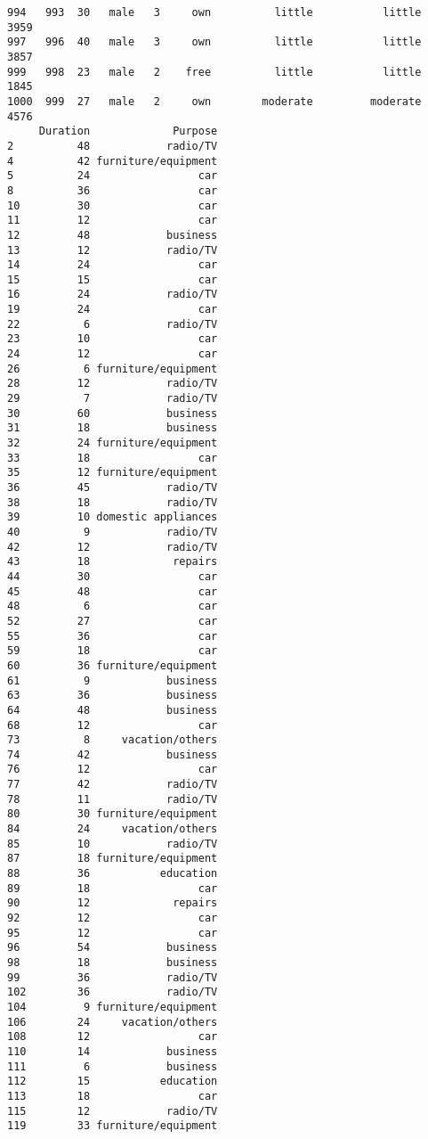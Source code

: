 \documentclass[
]{article}
\begin{document}
\begin{verbatim}
994   993  30   male   3     own          little           little          3959
997   996  40   male   3     own          little           little          3857
999   998  23   male   2    free          little           little          1845
1000  999  27   male   2     own        moderate         moderate          4576
     Duration             Purpose
2          48            radio/TV
4          42 furniture/equipment
5          24                 car
8          36                 car
10         30                 car
11         12                 car
12         48            business
13         12            radio/TV
14         24                 car
15         15                 car
16         24            radio/TV
19         24                 car
22          6            radio/TV
23         10                 car
24         12                 car
26          6 furniture/equipment
28         12            radio/TV
29          7            radio/TV
30         60            business
31         18            business
32         24 furniture/equipment
33         18                 car
35         12 furniture/equipment
36         45            radio/TV
38         18            radio/TV
39         10 domestic appliances
40          9            radio/TV
42         12            radio/TV
43         18             repairs
44         30                 car
45         48                 car
48          6                 car
52         27                 car
55         36                 car
59         18                 car
60         36 furniture/equipment
61          9            business
63         36            business
64         48            business
68         12                 car
73          8     vacation/others
74         42            business
76         12                 car
77         42            radio/TV
78         11            radio/TV
80         30 furniture/equipment
84         24     vacation/others
85         10            radio/TV
87         18 furniture/equipment
88         36           education
89         18                 car
90         12             repairs
92         12                 car
95         12                 car
96         54            business
98         18            business
99         36            radio/TV
102        36            radio/TV
104         9 furniture/equipment
106        24     vacation/others
108        12                 car
110        14            business
111         6            business
112        15           education
113        18                 car
115        12            radio/TV
119        33 furniture/equipment

\end{verbatim}
\end{document}
